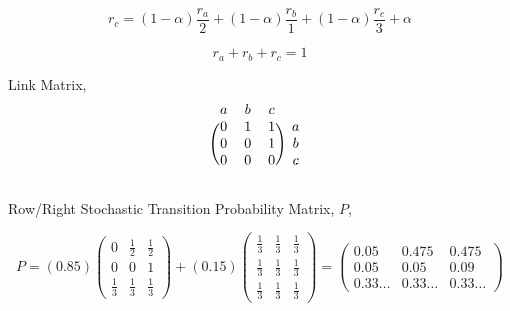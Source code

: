 \documentclass[12pt]{article}
\begin{document}
\begin{equation}
	r_c = (1-\alpha)\frac{r_a}{2} + (1-\alpha)\frac{r_b}{1} + (1-\alpha)\frac{r_c}{3} + \alpha
\end{equation}

\begin{equation}
	r_a + r_b + r_c = 1
\end{equation}


%
%

Link Matrix,
\[
\begin{blockarray}{cccc}
a & b & c \\
\begin{block}{(ccc)c}
  0 & 1 & 1 & a \\
  0 & 0 & 1 & b \\
  0 & 0 & 0 & c \\
\end{block}
\end{blockarray}
\]

Row/Right Stochastic Transition Probability Matrix, $P$, 

$$
P = 
\left( 0.85 \right)
\begin{pmatrix} 
  0 	& \frac{1}{2} 	& \frac{1}{2}  \\
  0 	& 0 			& 1 		 \\
  \frac{1}{3} 	& \frac{1}{3} 	& \frac{1}{3}
\end{pmatrix}
 + 
\left( 0.15 \right)
\begin{pmatrix} 
  \frac{1}{3} 	& \frac{1}{3} 	& \frac{1}{3} \\
  \frac{1}{3} 	& \frac{1}{3} 	& \frac{1}{3} \\
  \frac{1}{3} 	& \frac{1}{3} 	& \frac{1}{3}
\end{pmatrix}
=
\begin{pmatrix} 
  0.05 	& 0.475 	& 0.475 \\
  0.05 	& 0.05 	& 0.09 \\
  0.33 \dots 	&  0.33 \dots 	&  0.33 \dots
\end{pmatrix}
$$


\fi
\end{document}
